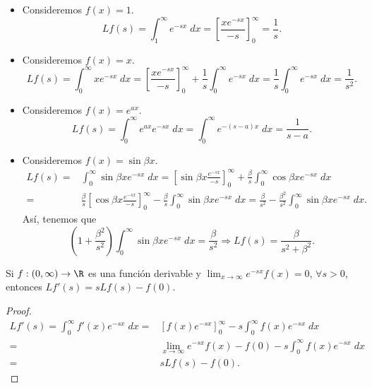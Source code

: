 \begin{eg}
\normalfont 
\begin{itemize}
\item Consideremos $\displaystyle f\left(x\right) = 1 $. 
	\[Lf\left(s\right) = \int^{\infty}_{1} e^{-sx} \; dx = \left[\frac{xe^{-sx}}{-s}\right] ^{\infty}_{0} = \frac{1}{s}.\]
\item Consideremos $\displaystyle f\left(x\right) = x $. 
	\[Lf\left(s\right) = \int^{\infty}_{0} xe^{-sx} \; dx = \left[\frac{xe^{-sx}}{-s}\right] ^{\infty}_{0} + \frac{1}{s}\int^{\infty}_{0} e^{-sx} \; dx = \frac{1}{s}\int^{\infty}_{0} e^{-sx} \; dx = \frac{1}{s^{2}} .\]
\item Consideremos $\displaystyle f\left(x\right) = e^{ax} $.
	\[Lf\left(s\right) = \int^{\infty}_{0} e^{ax}e^{-sx} \; dx = \int^{\infty}_{0} e^{-\left(s-a\right)x} \; dx = \frac{1}{s-a} .\]
\item Consideremos $\displaystyle f\left(x\right) = \sin \beta x $. 
	\[
	\begin{split}
		Lf\left(s\right) = & \int^{\infty}_{0} \sin \beta x e^{-sx} \; dx = \left[\sin\beta x \frac{e^{-sx}}{-s}\right] ^{\infty}_{0} + \frac{\beta }{s}\int^{\infty}_{0} \cos \beta x e^{-sx} \; dx \\
		= & \frac{\beta }{s}\left[\cos \beta x \frac{e^{-sx}}{-s}\right] ^{\infty}_{0} - \frac{\beta }{s}\int^{\infty}_{0} \sin \beta x e^{-sx} \; dx = \frac{\beta }{s^{2}} - \frac{\beta^{2}}{s^{2}}\int^{\infty}_{0} \sin \beta x e^{-sx} \; dx .
	\end{split}
	\]
	Así, tenemos que
	\[\left(1 + \frac{\beta^{2}}{s^{2}}\right)\int^{\infty}_{0} \sin \beta x e^{-sx} \; dx = \frac{\beta }{s^{2}} \Rightarrow Lf\left(s\right) = \frac{\beta }{s^{2}+\beta^{2}}.\]
\end{itemize}
\end{eg}
\begin{fprop}[]
\normalfont Si $\displaystyle f : \left(0,\infty\right) \to \R $ es una función derivable y $\displaystyle \lim_{x \to \infty}e^{-sx}f\left(x\right) = 0 $, $\displaystyle \forall s > 0 $, entonces $\displaystyle Lf'\left(s\right) = sLf\left(s\right) - f\left(0\right) $.
\end{fprop}
\begin{proof}
\[
\begin{split}
	Lf'\left(s\right) = \int^{\infty}_{0} f'\left(x\right)e^{-sx} \; dx = & \left[f\left(x\right)e^{-sx}\right] ^{\infty}_{0} - s\int^{\infty}_{0} f\left(x\right)e^{-sx} \; dx \\
	= &  \lim_{x \to \infty}e^{-sx}f\left(x\right)-f\left(0\right) - s \int^{\infty}_{0} f\left(x\right)e^{-sx} \; dx \\
	= & sLf\left(s\right)-f\left(0\right).
\end{split}
\]
\end{proof}
